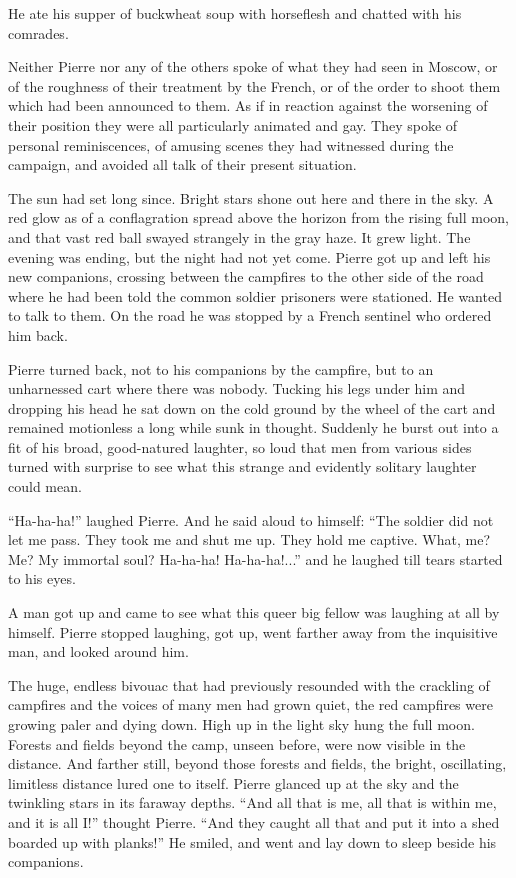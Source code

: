 He ate his supper of buckwheat soup with horseflesh and chatted
with his comrades.

Neither Pierre nor any of the others spoke of what they had seen
in Moscow, or of the roughness of their treatment by the French,
or of the order to shoot them which had been announced to
them. As if in reaction against the worsening of their position
they were all particularly animated and gay. They spoke of
personal reminiscences, of amusing scenes they had witnessed
during the campaign, and avoided all talk of their present
situation.

The sun had set long since. Bright stars shone out here and there
in the sky. A red glow as of a conflagration spread above the
horizon from the rising full moon, and that vast red ball swayed
strangely in the gray haze. It grew light. The evening was
ending, but the night had not yet come. Pierre got up and left
his new companions, crossing between the campfires to the other
side of the road where he had been told the common soldier
prisoners were stationed. He wanted to talk to them. On the road
he was stopped by a French sentinel who ordered him back.

Pierre turned back, not to his companions by the campfire, but to
an unharnessed cart where there was nobody. Tucking his legs
under him and dropping his head he sat down on the cold ground by
the wheel of the cart and remained motionless a long while sunk
in thought. Suddenly he burst out into a fit of his broad,
good-natured laughter, so loud that men from various sides turned
with surprise to see what this strange and evidently solitary
laughter could mean.

``Ha-ha-ha!'' laughed Pierre. And he said aloud to himself: ``The
soldier did not let me pass. They took me and shut me up. They
hold me captive.  What, me? Me? My immortal soul? Ha-ha-ha!
Ha-ha-ha!...'' and he laughed till tears started to his eyes.

A man got up and came to see what this queer big fellow was
laughing at all by himself. Pierre stopped laughing, got up, went
farther away from the inquisitive man, and looked around him.

The huge, endless bivouac that had previously resounded with the
crackling of campfires and the voices of many men had grown
quiet, the red campfires were growing paler and dying down. High
up in the light sky hung the full moon. Forests and fields beyond
the camp, unseen before, were now visible in the distance. And
farther still, beyond those forests and fields, the bright,
oscillating, limitless distance lured one to itself. Pierre
glanced up at the sky and the twinkling stars in its faraway
depths. ``And all that is me, all that is within me, and it is
all I!'' thought Pierre. ``And they caught all that and put it
into a shed boarded up with planks!'' He smiled, and went and lay
down to sleep beside his companions.

